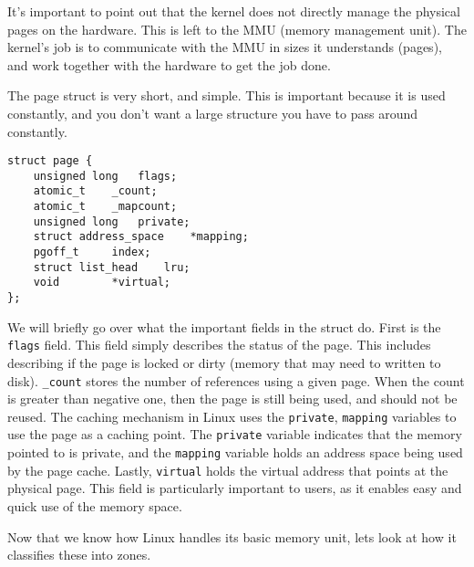\documentclass[10pt,letterpaper,onecolumn,draftclsnofoot]{IEEEtran}
\begin{document}
It's important to point out that the kernel does not directly manage the
physical pages on the hardware. This is left to the MMU (memory
management unit). The kernel's job is to communicate with the MMU in
sizes it understands (pages), and work together with the hardware to
get the job done. 

The page struct is very short, and simple. This is important because it
is used constantly, and you don't want a large structure you have to 
pass around constantly. \cite{robertlove2010}

\begin{lstlisting}[caption=The Linux page struct - the primary descriptor and basic unit of memory]
struct page {
	unsigned long	flags;
	atomic_t	_count;
	atomic_t	_mapcount;
	unsigned long	private;
	struct address_space	*mapping;
	pgoff_t		index;
	struct list_head	lru;
	void 		*virtual;
};
\end{lstlisting}

We will briefly go over what the important fields in the struct do.
First is the \texttt{flags} field. This field simply describes the
status of the page. This includes describing if the page is locked or
dirty (memory that may need to written to disk). \texttt{\_count}
stores the number of references using a given page. When the count is
greater than negative one, then the page is still being used, and should
not be reused. The caching mechanism in Linux uses the \texttt{private},
\texttt{mapping} variables to use the page as a caching point. The
\texttt{private} variable indicates that the memory pointed to is private,
and the \texttt{mapping} variable holds an address space being used by
the page cache. Lastly, \texttt{virtual} holds the virtual address that
points at the physical page. This field is particularly important to
users, as it enables easy and quick use of the memory space.

Now that we know how Linux handles its basic memory unit, lets look at
how it classifies these into zones. 
\end{document}
